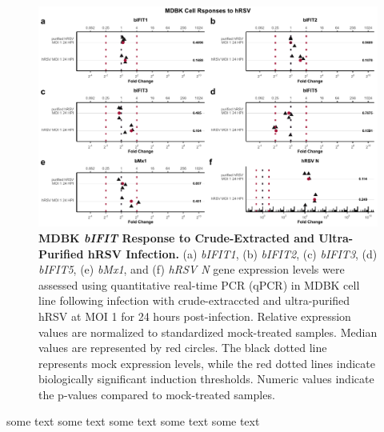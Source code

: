 \begin{figure}
    \centering
    \includegraphics[width=1\linewidth]{07. Chapter 2/Figs/02. Induction/07. mdbk_hrsv.pdf}
    \caption[MDBK \textit{bIFIT} Response to Crude-Extracted and Ultra-Purified hRSV Infection.]{\textbf{MDBK \textit{bIFIT} Response to Crude-Extracted and Ultra-Purified hRSV Infection.} (a) \textit{bIFIT1}, (b) \textit{bIFIT2}, (c) \textit{bIFIT3}, (d) \textit{bIFIT5}, (e) \textit{bMx1}, and (f) \textit{hRSV N} gene expression levels were assessed using quantitative real-time PCR (qPCR) in MDBK cell line following infection with crude-extraccted and ultra-purified hRSV at MOI 1 for 24 hours post-infection. Relative expression values are normalized to standardized mock-treated samples. Median values are represented by red circles. The black dotted line represents mock expression levels, while the red dotted lines indicate biologically significant induction thresholds. Numeric values indicate the p-values compared to mock-treated samples.}
    \label{fig:bIFIT responses to hRSV infection in MDBK}
\end{figure}

some text some text some text some text some text

